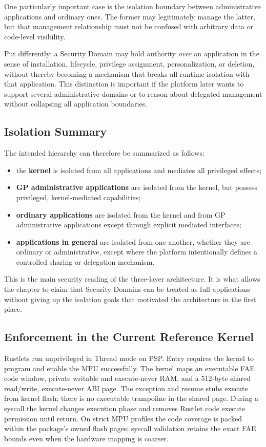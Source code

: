 One particularly important case is the isolation boundary between
administrative applications and ordinary ones. The former may legitimately
manage the latter, but that management relationship must not be confused
with arbitrary data or code-level visibility.

Put differently: a Security Domain may hold authority \emph{over} an
application in the sense of installation, lifecycle, privilege
assignment, personalization, or deletion, without thereby becoming a
mechanism that breaks all runtime isolation with that application. This
distinction is important if the platform later wants to support several
administrative domains or to reason about delegated management without
collapsing all application boundaries.

\subsection{Isolation Summary}

The intended hierarchy can therefore be summarized as follows:
\begin{itemize}
\item the \textbf{kernel} is isolated from all applications and mediates
  all privileged effects;
\item \textbf{GP administrative applications} are isolated from the
  kernel, but possess privileged, kernel-mediated capabilities;
\item \textbf{ordinary applications} are isolated from the
  kernel and from GP administrative applications except through explicit
  mediated interfaces;
\item \textbf{applications in general} are isolated from one another,
  whether they are ordinary or administrative, except where the platform
  intentionally defines a controlled sharing or delegation mechanism.
\end{itemize}

This is the main security reading of the three-layer architecture. It is
what allows the chapter to claim that Security Domains can be treated as
full applications without giving up the isolation goals that motivated
the architecture in the first place.

\subsection{Enforcement in the Current Reference Kernel}
\label{sec:system-current-isolation}

Rustlets run unprivileged in Thread mode on PSP. Entry requires the kernel
to program and enable the MPU successfully. The kernel maps an executable FAE
code window, private writable and execute-never RAM, and a 512-byte shared
read/write, execute-never ABI page. The exception and resume stubs execute
from kernel flash; there is no executable trampoline in the shared page.
During a syscall the kernel changes execution phase and removes Rustlet code
execute permission until return. On strict MPU profiles the code coverage is
packed within the package's owned flash pages; syscall validation retains the
exact FAE bounds even when the hardware mapping is coarser.

